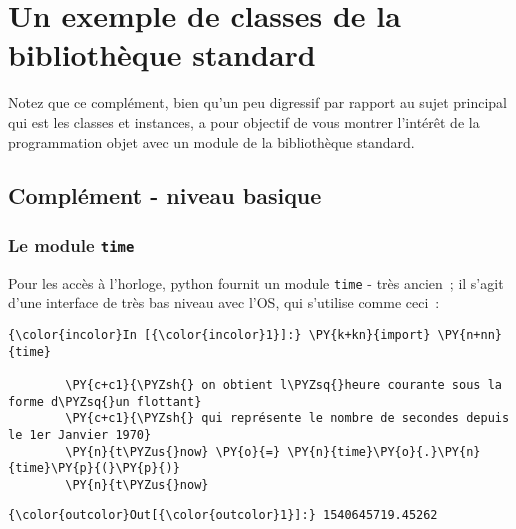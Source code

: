     
    
    
    

    

    \hypertarget{un-exemple-de-classes-de-la-bibliothuxe8que-standard}{%
\section{Un exemple de classes de la bibliothèque
standard}\label{un-exemple-de-classes-de-la-bibliothuxe8que-standard}}

    Notez que ce complément, bien qu'un peu digressif par rapport au sujet
principal qui est les classes et instances, a pour objectif de vous
montrer l'intérêt de la programmation objet avec un module de la
bibliothèque standard.

    \hypertarget{compluxe9ment---niveau-basique}{%
\subsection{Complément - niveau
basique}\label{compluxe9ment---niveau-basique}}

    \hypertarget{le-module-time}{%
\subsubsection{\texorpdfstring{Le module
\texttt{time}}{Le module time}}\label{le-module-time}}

    Pour les accès à l'horloge, python fournit un module \texttt{time} -
très ancien~; il s'agit d'une interface de très bas niveau avec l'OS,
qui s'utilise comme ceci~:

    \begin{Verbatim}[commandchars=\\\{\},frame=single,framerule=0.3mm,rulecolor=\color{cellframecolor}]
{\color{incolor}In [{\color{incolor}1}]:} \PY{k+kn}{import} \PY{n+nn}{time}
        
        \PY{c+c1}{\PYZsh{} on obtient l\PYZsq{}heure courante sous la forme d\PYZsq{}un flottant}
        \PY{c+c1}{\PYZsh{} qui représente le nombre de secondes depuis le 1er Janvier 1970}
        \PY{n}{t\PYZus{}now} \PY{o}{=} \PY{n}{time}\PY{o}{.}\PY{n}{time}\PY{p}{(}\PY{p}{)}
        \PY{n}{t\PYZus{}now}
\end{Verbatim}


\begin{Verbatim}[commandchars=\\\{\},frame=single,framerule=0.3mm,rulecolor=\color{cellframecolor}]
{\color{outcolor}Out[{\color{outcolor}1}]:} 1540645719.45262
\end{Verbatim}
            
